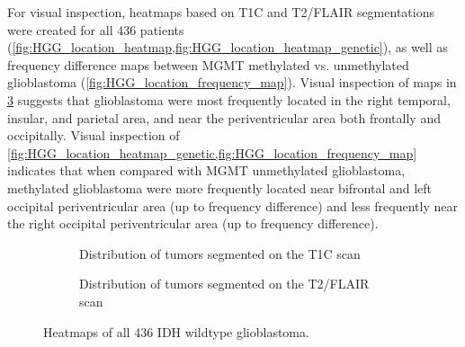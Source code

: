 For visual inspection, heatmaps based on \gls{T1C} and \gls{T2}/\gls{FLAIR} segmentations were created for all 436 patients (\cref{fig:HGG_location_heatmap,fig:HGG_location_heatmap_genetic}), as well as frequency difference maps between \gls{MGMT} methylated vs. unmethylated glioblastoma (\cref{fig:HGG_location_frequency_map}).
Visual inspection of maps in \cref{fig:HGG_location_heatmap} suggests that glioblastoma were most frequently located in the right temporal, insular, and parietal area, and near the periventricular area both frontally and occipitally.
Visual inspection of \cref{fig:HGG_location_heatmap_genetic,fig:HGG_location_frequency_map} indicates that when compared with \gls{MGMT} unmethylated glioblastoma, methylated glioblastoma were more frequently located near bifrontal and left occipital periventricular area (up to  frequency difference) and less frequently near the right occipital periventricular area (up to  frequency difference).



\begin{figure}
\centering
\begin{subfigure}[b]{\textwidth}
    \centering
    \caption{Distribution of \glspl{tumor} segmented on  the \gls{T1C} scan}\label{fig:HGG_location_heatmap_all_T1}
\end{subfigure}
\begin{subfigure}[b]{\textwidth}
    \centering
    \caption{Distribution of \glspl{tumor} segmented on  the \gls{T2}/\gls{FLAIR} scan}\label{fig:HGG_location_heatmap_all_T2}
\end{subfigure}
\caption{Heatmaps of all 436 \acrshort{IDH} wildtype glioblastoma.}\label{fig:HGG_location_heatmap}
\end{figure}


